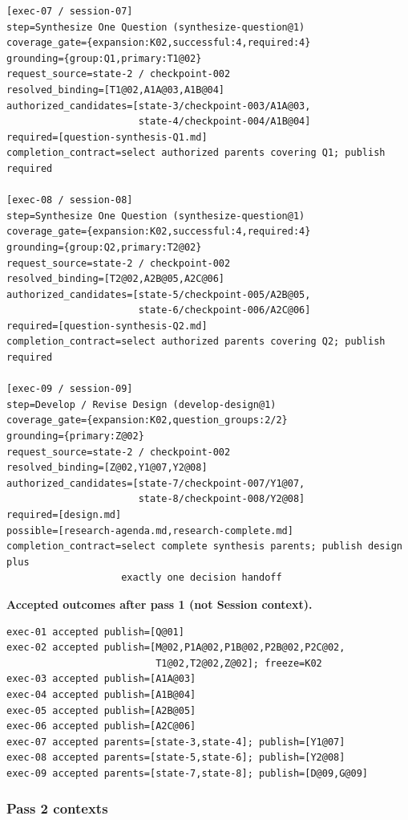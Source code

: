\documentclass[11pt]{article}
\begin{document}
\begin{lstlisting}[style=playbook,basicstyle=\ttfamily\tiny]
[exec-07 / session-07]
step=Synthesize One Question (synthesize-question@1)
coverage_gate={expansion:K02,successful:4,required:4}
grounding={group:Q1,primary:T1@02}
request_source=state-2 / checkpoint-002
resolved_binding=[T1@02,A1A@03,A1B@04]
authorized_candidates=[state-3/checkpoint-003/A1A@03,
                       state-4/checkpoint-004/A1B@04]
required=[question-synthesis-Q1.md]
completion_contract=select authorized parents covering Q1; publish required

[exec-08 / session-08]
step=Synthesize One Question (synthesize-question@1)
coverage_gate={expansion:K02,successful:4,required:4}
grounding={group:Q2,primary:T2@02}
request_source=state-2 / checkpoint-002
resolved_binding=[T2@02,A2B@05,A2C@06]
authorized_candidates=[state-5/checkpoint-005/A2B@05,
                       state-6/checkpoint-006/A2C@06]
required=[question-synthesis-Q2.md]
completion_contract=select authorized parents covering Q2; publish required

[exec-09 / session-09]
step=Develop / Revise Design (develop-design@1)
coverage_gate={expansion:K02,question_groups:2/2}
grounding={primary:Z@02}
request_source=state-2 / checkpoint-002
resolved_binding=[Z@02,Y1@07,Y2@08]
authorized_candidates=[state-7/checkpoint-007/Y1@07,
                       state-8/checkpoint-008/Y2@08]
required=[design.md]
possible=[research-agenda.md,research-complete.md]
completion_contract=select complete synthesis parents; publish design plus
                    exactly one decision handoff
\end{lstlisting}

\noindent\textbf{Accepted outcomes after pass 1 (not Session context).}
\begin{lstlisting}[style=playbook,basicstyle=\ttfamily\scriptsize]
exec-01 accepted publish=[Q@01]
exec-02 accepted publish=[M@02,P1A@02,P1B@02,P2B@02,P2C@02,
                          T1@02,T2@02,Z@02]; freeze=K02
exec-03 accepted publish=[A1A@03]
exec-04 accepted publish=[A1B@04]
exec-05 accepted publish=[A2B@05]
exec-06 accepted publish=[A2C@06]
exec-07 accepted parents=[state-3,state-4]; publish=[Y1@07]
exec-08 accepted parents=[state-5,state-6]; publish=[Y2@08]
exec-09 accepted parents=[state-7,state-8]; publish=[D@09,G@09]
\end{lstlisting}

\subsubsection{Pass 2 contexts}
\end{document}
